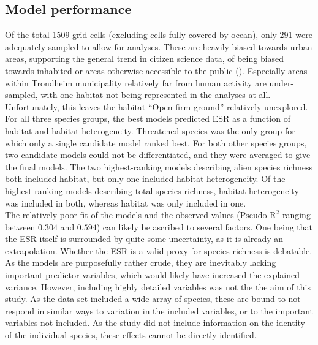 \documentclass{article}
\begin{document}
\subsection{Model performance}
Of the total 1509 grid cells (excluding cells fully covered by ocean), only 291 were adequately sampled to allow for analyses. These are heavily biased towards urban areas, supporting the general trend in citizen science data, of being biased towards inhabited or areas otherwise accessible to the public (\cite{Graham2004}). %
Especially areas within Trondheim municipality relatively far from human activity are under-sampled, with one habitat not being represented in the analyses at all. Unfortunately, this leaves the habitat ``Open firm ground'' relatively unexplored.\\ %
For all three species groups, the best models predicted ESR as a function of habitat and habitat heterogeneity. Threatened species was the only group for which only a single candidate model ranked best. For both other species groups, two candidate models could not be differentiated, and they were averaged to give the final models. The two highest-ranking models describing alien species richness both included habitat, but only one included habitat heterogeneity. Of the highest ranking models describing total species richness, habitat heterogeneity was included in both, whereas habitat was only included in one. \\
The relatively poor fit of the models and the observed values ($\text{Pseudo-R}^2$ ranging between $0.304$ and $0.594$) can likely be ascribed to several factors. One being that the ESR itself is surrounded by quite some uncertainty, as it is already an extrapolation. Whether the ESR is a valid proxy for species richness is debatable. As the models are purposefully rather crude, they are inevitably lacking important predictor variables, which would likely have increased the explained variance. However, including highly detailed variables was not the the aim of this study. As the data-set included a wide array of species, these are bound to not respond in similar ways to variation in the included variables, or to the important variables not included. As the study did not include information on the identity of the individual species, these effects cannot be directly identified.   %
\end{document}

